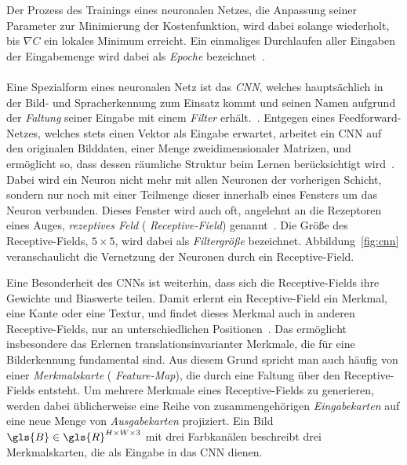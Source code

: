 Der Prozess des Trainings eines neuronalen Netzes, \dhe{} die Anpassung seiner Parameter zur Minimierung der Kostenfunktion, wird dabei solange wiederholt, bis $\nabla C$ ein lokales Minimum erreicht.
Ein einmaliges Durchlaufen aller Eingaben der Eingabemenge wird dabei als \emph{Epoche} bezeichnet~\cite{Nielsen}.
\\\\
Eine Spezialform eines neuronalen Netz ist das \emph{\gls{CNN}}, welches hauptsächlich in der Bild- und Spracherkennung zum Einsatz kommt und seinen Namen aufgrund der \emph{Faltung} seiner Eingabe mit einem \emph{Filter} erhält.~\cite{cnn}.
Entgegen eines Feedforward-Netzes, welches stets einen Vektor als Eingabe erwartet, arbeitet ein \gls{CNN} auf den originalen Bilddaten, \dhe{} einer Menge zweidimensionaler Matrizen, und ermöglicht so, dass dessen räumliche Struktur beim Lernen berücksichtigt wird~\cite{Nielsen}.
Dabei wird ein Neuron nicht mehr mit allen Neuronen der vorherigen Schicht, sondern nur noch mit einer Teilmenge dieser innerhalb eines Fensters um das Neuron verbunden.
Dieses Fenster wird auch oft, angelehnt an die Rezeptoren eines Auges, \emph{rezeptives Feld} (\engl{} \emph{Receptive-Field}) genannt~\cite{cnn}.
Die Größe des Receptive-Fields, \zB{} $5 \times 5$, wird dabei als \emph{Filtergröße} bezeichnet.
Abbildung~\ref{fig:cnn} veranschaulicht die Vernetzung der Neuronen durch ein Receptive-Field.

Eine Besonderheit des \glspl{CNN} ist weiterhin, dass sich die Receptive-Fields ihre Gewichte und Biaswerte teilen.
Damit erlernt ein Receptive-Field ein Merkmal, \zB{} eine Kante oder eine Textur, und findet dieses Merkmal auch in anderen Receptive-Fields, nur an unterschiedlichen Positionen~\cite{Nielsen}.
Das ermöglicht insbesondere das Erlernen translationsinvarianter Merkmale, die für eine Bilderkennung fundamental sind.
Aus diesem Grund spricht man auch häufig von einer \emph{Merkmalskarte} (\engl{} \emph{Feature-Map}), die durch eine Faltung über den Receptive-Fields entsteht.
Um mehrere Merkmale eines Receptive-Fields zu generieren, werden dabei üblicherweise eine Reihe von zusammengehörigen \emph{Eingabekarten} auf eine neue Menge von \emph{Ausgabekarten} projiziert.
Ein Bild $\gls{B} \in \gls{R}^{H \times W \times 3}$ mit drei Farbkanälen beschreibt \zB{} drei Merkmalskarten, die als Eingabe in das \gls{CNN} dienen.

